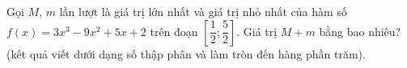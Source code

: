 \begin{bt}%
    Gọi $M$, $m$ lần lượt là giá trị lớn nhất và giá trị nhỏ nhất của hàm số \break $f(x)=3x^3-9x^2+5x+2$ trên đoạn $\left[\dfrac{1}{2};\dfrac{5}{2}\right]$. Giá trị $M+m$ bằng bao nhiêu? (kết quả viết dưới dạng số thập phân và làm tròn đến hàng phần trăm).
\end{bt}

